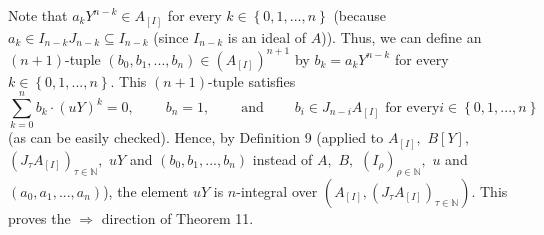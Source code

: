 \documentclass[12pt,final,notitlepage,onecolumn]{article}%
\begin{document}
Note that $a_{k}Y^{n-k}\in A_{\left[  I\right]  }$ for every $k\in\left\{
0,1,...,n\right\}  $ (because $a_{k}\in I_{n-k}J_{n-k}\subseteq I_{n-k}$
(since $I_{n-k}$ is an ideal of $A$)). Thus, we can define an $\left(
n+1\right)  $-tuple $\left(  b_{0},b_{1},...,b_{n}\right)  \in\left(
A_{\left[  I\right]  }\right)  ^{n+1}$ by $b_{k}=a_{k}Y^{n-k}$ for every
$k\in\left\{  0,1,...,n\right\}  $. This $\left(  n+1\right)  $-tuple
satisfies%
\[
\sum\limits_{k=0}^{n}b_{k}\cdot\left(  uY\right)  ^{k}%
=0,\ \ \ \ \ \ \ \ \ \ b_{n}=1,\ \ \ \ \ \ \ \ \ \ \text{and}%
\ \ \ \ \ \ \ \ \ \ b_{i}\in J_{n-i}A_{\left[  I\right]  }\text{ for every
}i\in\left\{  0,1,...,n\right\}
\]
(as can be easily checked). Hence, by Definition 9 (applied to $A_{\left[
I\right]  },$ $B\left[  Y\right]  ,$ $\left(  J_{\tau}A_{\left[  I\right]
}\right)  _{\tau\in\mathbb{N}},$ $uY$ and $\left(  b_{0},b_{1},...,b_{n}%
\right)  $ instead of $A,$ $B,$ $\left(  I_{\rho}\right)  _{\rho\in\mathbb{N}%
},$ $u$ and $\left(  a_{0},a_{1},...,a_{n}\right)  $), the element $uY$ is
$n$-integral over $\left(  A_{\left[  I\right]  },\left(  J_{\tau}A_{\left[
I\right]  }\right)  _{\tau\in\mathbb{N}}\right)  $. This proves the
$\Longrightarrow$ direction of Theorem 11.
\end{document}

